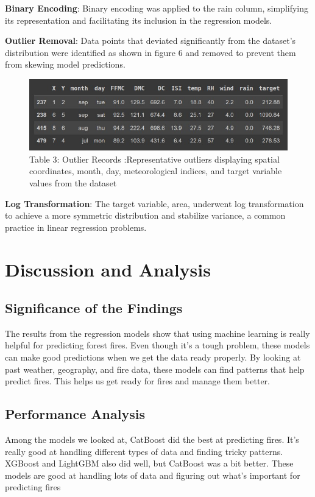 \textbf{Binary Encoding}: Binary encoding was applied to the rain column, simplifying its representation and facilitating its inclusion in the regression models.

\textbf{Outlier Removal}: Data points that deviated significantly from the dataset's distribution were identified as shown in figure 6 and removed to prevent them from skewing model predictions.

\begin{figure}[ht]
    \centering
    \includegraphics[scale=0.9]{figures/Outlier Records.jpg}
    \caption{Table 3: Outlier Records :Representative outliers displaying spatial coordinates, month, day, meteorological indices, and target variable values from the dataset}
    \label{fig:example-02}
\end{figure}

\textbf{Log Transformation}: The target variable, area, underwent log transformation to achieve a more symmetric distribution and stabilize variance, a common practice in linear regression problems.


\chapter{Discussion and Analysis}
\section{Significance of the Findings}
The results from the regression models show that using machine learning is really helpful for predicting forest fires. Even though it's a tough problem, these models can make good predictions when we get the data ready properly. By looking at past weather, geography, and fire data, these models can find patterns that help predict fires. This helps us get ready for fires and manage them better.

\section{Performance Analysis}
Among the models we looked at, CatBoost did the best at predicting fires. It's really good at handling different types of data and finding tricky patterns. XGBoost and LightGBM also did well, but CatBoost was a bit better. These models are good at handling lots of data and figuring out what's important for predicting fires

